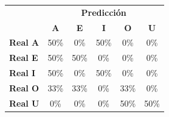 \begin{tabular}{lccccc}
\toprule
 & \multicolumn{5}{c}{\textbf{Predicción}} \\
 & \textbf{A} & \textbf{E} & \textbf{I} & \textbf{O} & \textbf{U} \\
\midrule
\textbf{Real A} & \cellcolor[rgb]{0.65,0.65,1.00} \color{white} 50\% & \cellcolor[rgb]{1.00,1.00,1.00}  0\% & \cellcolor[rgb]{0.65,0.65,1.00} \color{white} 50\% & \cellcolor[rgb]{1.00,1.00,1.00}  0\% & \cellcolor[rgb]{1.00,1.00,1.00}  0\% \\
\textbf{Real E} & \cellcolor[rgb]{0.65,0.65,1.00} \color{white} 50\% & \cellcolor[rgb]{0.65,0.65,1.00} \color{white} 50\% & \cellcolor[rgb]{1.00,1.00,1.00}  0\% & \cellcolor[rgb]{1.00,1.00,1.00}  0\% & \cellcolor[rgb]{1.00,1.00,1.00}  0\% \\
\textbf{Real I} & \cellcolor[rgb]{0.65,0.65,1.00} \color{white} 50\% & \cellcolor[rgb]{1.00,1.00,1.00}  0\% & \cellcolor[rgb]{0.65,0.65,1.00} \color{white} 50\% & \cellcolor[rgb]{1.00,1.00,1.00}  0\% & \cellcolor[rgb]{1.00,1.00,1.00}  0\% \\
\textbf{Real O} & \cellcolor[rgb]{0.77,0.77,1.00}  33\% & \cellcolor[rgb]{0.77,0.77,1.00}  33\% & \cellcolor[rgb]{1.00,1.00,1.00}  0\% & \cellcolor[rgb]{0.77,0.77,1.00}  33\% & \cellcolor[rgb]{1.00,1.00,1.00}  0\% \\
\textbf{Real U} & \cellcolor[rgb]{1.00,1.00,1.00}  0\% & \cellcolor[rgb]{1.00,1.00,1.00}  0\% & \cellcolor[rgb]{1.00,1.00,1.00}  0\% & \cellcolor[rgb]{0.65,0.65,1.00} \color{white} 50\% & \cellcolor[rgb]{0.65,0.65,1.00} \color{white} 50\% \\
\bottomrule
\end{tabular}